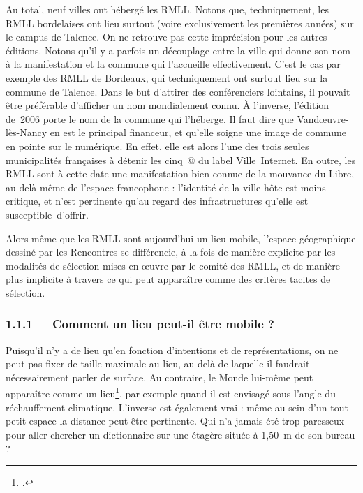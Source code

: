 \documentclass{FramateX}
\begin{document}
\begin{refsection}
Au total, neuf villes ont hébergé les RMLL. Notons que, techniquement,
les RMLL bordelaises ont lieu surtout (voire exclusivement les
premières années) sur le campus de Talence. On ne retrouve pas cette
imprécision pour les autres éditions. Notons qu'il y a parfois un
découplage entre la ville qui donne son nom à la manifestation et la
commune qui l'accueille effectivement. C'est le cas par exemple des
RMLL de Bordeaux, qui techniquement ont surtout lieu sur la commune de
Talence. Dans le but d'attirer des conférenciers lointains, il pouvait
être préférable d'afficher un nom mondialement connu. À l'inverse,
l'édition de~2006 porte le nom de la commune qui l'héberge. Il faut
dire que Vandœuvre-lès-Nancy en est le principal financeur, et qu'elle
soigne une image de commune en pointe sur le numérique. En effet, elle
est alors l'une des trois seules municipalités françaises à détenir les
cinq~@ du label Ville~Internet. En outre, les RMLL sont à cette date
une manifestation bien connue de la mouvance du Libre, au delà même de
l'espace francophone : l'identité de la ville hôte est moins critique,
et n'est pertinente qu'au regard des infrastructures qu'elle est
susceptible~d'offrir.

Alors même que les RMLL sont aujourd'hui un lieu mobile, l'espace
géographique dessiné par les Rencontres se différencie, à la fois de
manière explicite par les modalités de sélection mises en œuvre par le
comité des RMLL, et de manière plus implicite à travers ce qui peut
apparaître comme des critères tacites de sélection.

\subsubsection*{1.1.1~~~Comment un lieu peut-il être mobile ?}
{}


Puisqu'il n'y a de lieu qu'en fonction d'intentions et de
représentations, on ne peut pas fixer de taille maximale au lieu,
au-delà de laquelle il faudrait nécessairement parler de surface. Au
contraire, le Monde lui-même peut apparaître comme un lieu\footnote{\cite{retailletransformation2011}.}, par exemple quand il est envisagé sous l'angle du réchauffement
climatique. L'inverse est également vrai : même au sein d'un tout petit
espace la distance peut être pertinente. Qui n'a jamais été trop
paresseux pour aller chercher un dictionnaire sur une étagère située à
1,50~m de son bureau ?


\end{refsection}
\end{document}
